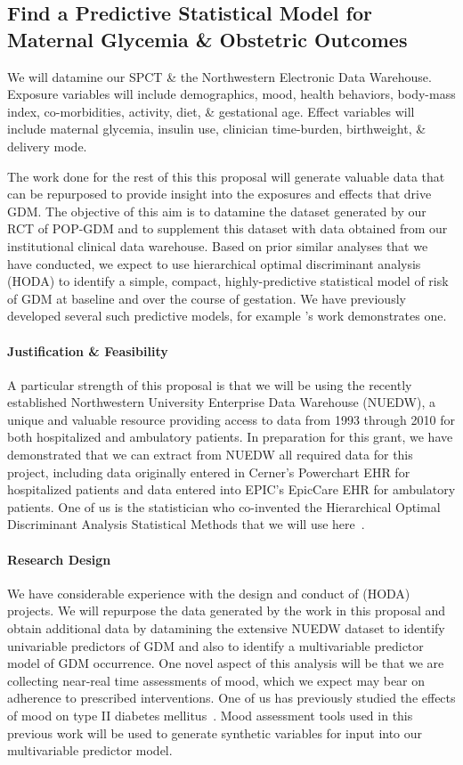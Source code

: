 \subsection{Find a Predictive Statistical Model for Maternal Glycemia \& Obstetric Outcomes}\label{sec:stat}
We will datamine our SPCT \& the Northwestern Electronic Data
Warehouse. Exposure variables will include demographics, mood, health
behaviors, body-mass index, co-morbidities, activity, diet, \&
gestational age. Effect variables will include maternal glycemia,
insulin use, clinician time-burden, birthweight, \& delivery mode.

The work done for the rest of this this proposal will generate
valuable data that can be repurposed to provide insight into the
exposures and effects that drive GDM. The objective of this aim is to
datamine the dataset generated by our RCT of POP-GDM and to supplement
this dataset with data obtained from our institutional clinical data
warehouse. Based on prior similar analyses that we have conducted, we
expect to use hierarchical optimal discriminant analysis (HODA) to
identify a simple, compact, highly-predictive statistical model of
risk of GDM at baseline and over the course of gestation. We have
previously developed several such predictive models, for example
\citet{KyriacouYarnoldBelknap2007}'s work demonstrates one.

\paragraph{Justification \& Feasibility} A particular strength of this
proposal is that we will be using the recently established
Northwestern University Enterprise Data Warehouse (NUEDW), a unique
and valuable resource providing access to data from 1993 through 2010
for both hospitalized and ambulatory patients. In preparation for this
grant, we have demonstrated that we can extract from NUEDW all
required data for this project, including data originally entered in
Cerner's Powerchart EHR for hospitalized patients and data entered
into EPIC's EpicCare EHR for ambulatory patients. One of us is the
statistician who co-invented the Hierarchical Optimal Discriminant
Analysis Statistical Methods that we will use here~\citep{Yarnold2004}.

\paragraph{Research Design} We have considerable experience with the design
and conduct of (HODA) projects. We will repurpose the data generated
by the work in this proposal and obtain additional data by datamining the extensive
NUEDW dataset to identify univariable predictors of GDM and also to
identify a multivariable predictor model of GDM occurrence. One novel
aspect of this analysis will be that we are collecting near-real time
assessments of mood, which we expect may bear on adherence to
prescribed interventions. One of us has previously studied the effects
of mood on type II diabetes mellitus~\citep{Hall2008}. Mood
assessment tools used in this previous work will be used to generate
synthetic variables for input into our multivariable predictor model.

